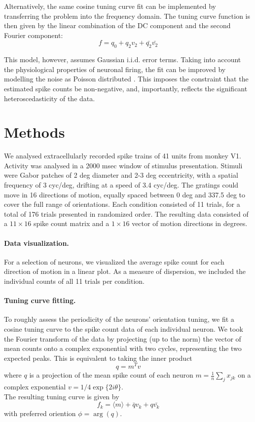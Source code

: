 \documentclass[10pt]{article}
\begin{document}
Alternatively, the same cosine tuning curve fit can be implemented by transferring the problem into the frequency domain. The tuning curve function is then given by the linear combination of the DC component and the second Fourier component:
\begin{equation*}
f = q_0+q_2v_2+ \bar{q_2}\bar{v_2}
\end{equation*}

This model, however, assumes Gaussian i.i.d. error terms. Taking into account the physiological properties of neuronal firing, the fit can be improved by modelling the noise as Poisson distributed \cite{softky1993highly}. This imposes the constraint that the estimated spike counts be non-negative, and, importantly, reflects the significant heteroscedasticity of the data.


\section*{Methods}

We analysed extracellularly recorded spike trains of 41 units from monkey V1. Activity was analysed in a 2000 msec window of stimulus presentation. Stimuli were Gabor patches of 2 deg diameter and 2-3 deg eccentricity, with a spatial frequency of 3 cyc/deg, drifting at a speed of 3.4 cyc/deg. The gratings could move in 16 directions of motion, equally spaced between 0 deg and 337.5 deg to cover the full range of orientations. Each condition consisted of 11 trials, for a total of 176 trials presented in randomized order. The resulting data consisted of a $11\times16$ spike count matrix and a $1\times16$ vector of motion directions in degrees.

\paragraph{Data visualization.} For a selection of neurons, we visualized the average spike count for each direction of motion in a linear plot. As a measure of dispersion, we included the individual counts of all 11 trials per condition.

\paragraph{Tuning curve fitting.} To roughly assess the periodicity of the neurons' orientation tuning, we fit a cosine tuning curve to the spike count data of each individual neuron. We took the Fourier transform of the data by projecting (up to the norm) the vector of mean counts onto a complex exponential with two cycles, representing the two expected peaks. This is equivalent to taking the inner product
\begin{equation*}
q = m^Tv
\end{equation*}
where $q$ is a projection of the mean spike count of each neuron $m = \frac{1}{n} \sum_j x_{jk}$ on a complex exponential $v = 1/4\exp \{2i \theta\} $. \\
The resulting tuning curve is given by
\begin{equation*}
f_k = \langle m \rangle + \bar{q} v_k + q \bar{v_k} 
\end{equation*}
with preferred oriention $\phi = \arg(q)$.
\end{document}
